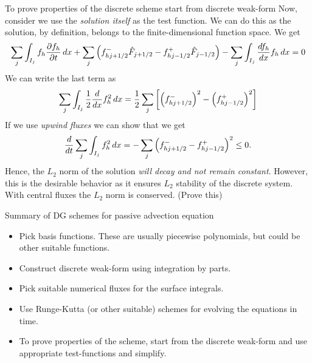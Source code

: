 \documentclass[pdf]{beamer}
\newcommand{\pfrac}[2]{\frac{\partial #1}{\partial #2}}
\theoremstyle{definition}
\begin{document}
\begin{frame}{To prove properties of the discrete scheme start from
    discrete weak-form}
  \footnotesize%
  Now, consider we use the \emph{solution itself} as the test
  function. We can do this as the solution, by definition, belongs to
  the finite-dimensional function space. We get
  \begin{align*}
    \sum_j \int_{I_j} f_h \pfrac{f_h}{t}\thinspace dx
    +
    \sum_j \left(f_{hj+1/2}^-\hat{F}_{j+1/2} - f_{hj-1/2}^+\hat{F}_{j-1/2}\right)
    -
    \sum_j \int_{I_j}  \frac{d f_h}{dx} f_h\thinspace dx = 0
  \end{align*}
  We can write the last term as
  \begin{align*}
    \sum_j \int_{I_j}  \frac{1}{2} \frac{d}{dx} f_h^2 \thinspace dx
    = \frac{1}{2} \sum_j \left[ \left(f_{hj+1/2}^-\right)^2  - \left(f_{hj-1/2}^+\right)^2 \right]
  \end{align*}
  If we use \emph{upwind fluxes} we can show that we get
  \begin{align*}
    \frac{d}{dt} \sum_j \int_{I_j}  f_h^2 \thinspace dx
    =
    -\sum_j \left(f_{hj+1/2}^- - f_{hj-1/2}^+\right)^2 \le 0.
  \end{align*}
  Hence, the $L_2$ norm of the solution \emph{will decay and not
    remain constant}. However, this is the desirable behavior as it
  ensures $L_2$ stability of the discrete system. With central fluxes
  the $L_2$ norm is conserved. (Prove this)
\end{frame}


\begin{frame}{Summary of DG schemes for passive advection equation}

  \begin{itemize}
  \item Pick basis functions. These are usually piecewise polynomials,
    but could be other suitable functions.
  \item Construct discrete weak-form using integration by parts.
  \item Pick suitable numerical fluxes for the surface integrals.
  \item Use Runge-Kutta (or other suitable) schemes for evolving the
    equations in time.
  \item To prove properties of the scheme, start from the discrete
    weak-form and use appropriate test-functions and simplify.
  \end{itemize}

\end{frame}
\end{document}
